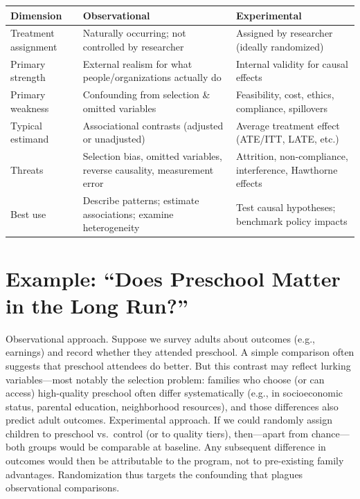 \documentclass[
  letterpaper,
  DIV=11,
  numbers=noendperiod]{scrreprt}
\begin{document}
\begin{longtable}[]{@{}
  >{\raggedright\arraybackslash}p{}
  >{\raggedright\arraybackslash}p{}
  >{\raggedright\arraybackslash}p{}@{}}
\toprule\noalign{}
\begin{minipage}[b]{\linewidth}\raggedright
Dimension
\end{minipage} & \begin{minipage}[b]{\linewidth}\raggedright
Observational
\end{minipage} & \begin{minipage}[b]{\linewidth}\raggedright
Experimental
\end{minipage} \\
\midrule\noalign{}
\endhead
\bottomrule\noalign{}
\endlastfoot
Treatment assignment & Naturally occurring; not controlled by researcher
& Assigned by researcher (ideally randomized) \\
Primary strength & External realism for what people/organizations
actually do & Internal validity for causal effects \\
Primary weakness & Confounding from selection \& omitted variables &
Feasibility, cost, ethics, compliance, spillovers \\
Typical estimand & Associational contrasts (adjusted or unadjusted) &
Average treatment effect (ATE/ITT, LATE, etc.) \\
Threats & Selection bias, omitted variables, reverse causality,
measurement error & Attrition, non-compliance, interference, Hawthorne
effects \\
Best use & Describe patterns; estimate associations; examine
heterogeneity & Test causal hypotheses; benchmark policy impacts \\
\end{longtable}

\section{Example: ``Does Preschool Matter in the Long
Run?''}\label{example-does-preschool-matter-in-the-long-run}

Observational approach. Suppose we survey adults about outcomes (e.g.,
earnings) and record whether they attended preschool. A simple
comparison often suggests that preschool attendees do better. But this
contrast may reflect lurking variables---most notably the selection
problem: families who choose (or can access) high-quality preschool
often differ systematically (e.g., in socioeconomic status, parental
education, neighborhood resources), and those differences also predict
adult outcomes. Experimental approach. If we could randomly assign
children to preschool vs.~control (or to quality tiers), then---apart
from chance---both groups would be comparable at baseline. Any
subsequent difference in outcomes would then be attributable to the
program, not to pre-existing family advantages. Randomization thus
targets the confounding that plagues observational comparisons.
\end{document}
